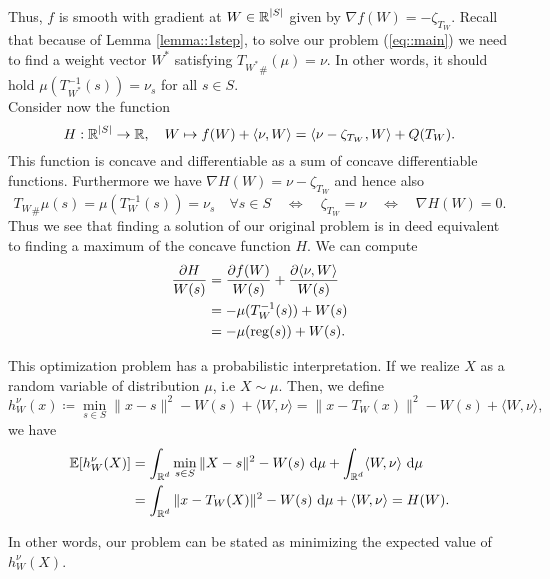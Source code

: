 \documentclass[
     12pt,         %
     a4paper,      %
     BCOR=10mm,     %
     DIV=14,        %
     ]{scrreprt}
\begin{document}
    Thus, $f$ is smooth with gradient at $W\in \operatorname{\mathbb{R}}^{|S|}$ given by $\nabla f(W) = - \zeta_{T_{W}}$.
    Recall that because of Lemma \ref{lemma::1step}, to solve our problem (\ref{eq::main}) we need to find a weight vector $W^*$ satisfying ${T_{W^*}}_{\#}(\mu) = \nu$. 
    In other words, it should hold $\mu(T_{W^*}^{-1} (s)) = \nu_s $ for all $s\in S$. \\
    Consider now the function
    \[H: \operatorname{\mathbb{R}}^{|S|} \to \operatorname{\mathbb{R}}, \quad W \mapsto f(W) + \langle \nu, W \rangle = \langle \nu - \zeta_{T_{W}}, W \rangle + Q(T_W). \]
    This function is concave and differentiable as a sum of concave differentiable functions. Furthermore we have $\nabla H(W) = \nu - \zeta_{T_{W}}$ and hence also
    \[ {T_{W}}_{\#}\mu(s) =\mu(T_W^{-1}(s)) = \nu_s \quad \forall s\in S \quad  \Leftrightarrow \quad  \zeta_{T_{W}} = \nu \quad  \Leftrightarrow \quad \nabla H(W) = 0. \]
    Thus we see that finding a solution of our original problem is in deed equivalent to finding a maximum of the concave function $H$. We can compute
    \begin{align*}
        \frac{\partial H}{W(s)}  &=  \frac{\partial f(W)}{W(s)}  + \frac{\partial \langle \nu, W \rangle}{W(s)} \\
                                &= -\mu(T_W^{-1}(s)) + W(s) \\
                                &= -\mu(\operatorname{reg}(s)) + W(s).
    \end{align*}
    
    This optimization problem has a probabilistic interpretation. If we realize $X$ as a random variable of distribution $\mu$, i.e $X \sim \mu$. Then, we define 
    \[h_W^\nu(x) \coloneqq \min_{s\in S} \|x-s\|^2 - W(s) + \langle W, \nu  \rangle = \|x-T_W(x)\|^2 -W(s) + \langle W, \nu  \rangle, \]
    we have
    \begin{align*}
        \operatorname{\mathbb{E}}[h_W^\nu(X)] &= \int_{\operatorname{\mathbb{R}}^d} \min_{s\in S} \|X-s\|^2 - W(s) \ {\operatorname{{\mathrm{d}}}} \mu + \int_{\operatorname{\mathbb{R}}^d} \langle W, \nu  \rangle  \ {\operatorname{{\mathrm{d}}}} \mu \\
                    &= \int_{\operatorname{\mathbb{R}}^d} \|x-T_W(X)\|^2 -W(s) \ {\operatorname{{\mathrm{d}}}} \mu + \langle W, \nu  \rangle  = H(W).
    \end{align*}

    In other words, our problem can be stated as minimizing the expected value of $h_W^\nu(X)$.
     
    
\end{document}
